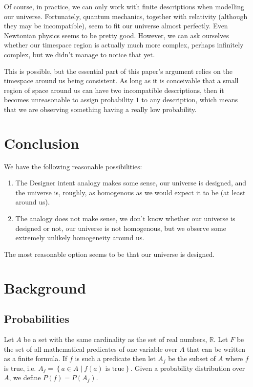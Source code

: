 \documentclass[a4paper
,draft
]{article}
\def\reale{\mathbb{R}}
\newcommand{\multime}[1]{\left\{ #1 \right\}}
\begin{document}
Of course, in practice, we can only work with finite descriptions when
modelling our universe.
Fortunately, quantum mechanics, together with
relativity (although they may be incompatible),
seem to fit our universe almost perfectly.
Even Newtonian physics seems to be pretty good.
However, we can ask ourselves whether our timespace
region is actually much more complex, perhaps infinitely complex,
but we didn't manage to notice that yet.

This is possible, but the essential part of this paper's argument relies on
the timespace around us being consistent.
As long as it is conceivable that
a small region of space around us can have two incompatible descriptions,
then it becomes unreasonable to assign probability $1$ to any description, which
means that we are observing something having a really low probability.

\section{Conclusion}

We have the following reasonable possibilities:

\begin{enumerate}
\item The Designer intent analogy makes some sense, our universe is designed,
      and the universe is, roughly, as homogenous as we would
      expect it to be (at least around us).
\item The analogy does not make sense, we don't know whether our universe is
      designed or not, our universe is not homogenous, but we observe some
      extremely unlikely homogeneity around us.
\end{enumerate}

The most reasonable option seems to be that our universe is designed.

\section{Background}
\label{sec:background}
\subsection{Probabilities}
\label{sec:probabilities}

Let $A$ be a set with the same cardinality as the set of real numbers, $\reale$.
Let $F$ be the set of
all mathematical predicates of one variable over $A$ that can be written as a
finite formula.
If $f$ is such a predicate then let $A_f$ be the subset of
$A$ where $f$ is true, i.e. $A_f=\multime{a\in A\mid f(a) \mbox{ is true}}$.
Given a probability distribution over $A$, we define $P(f)=P(A_f)$.
\end{document}
